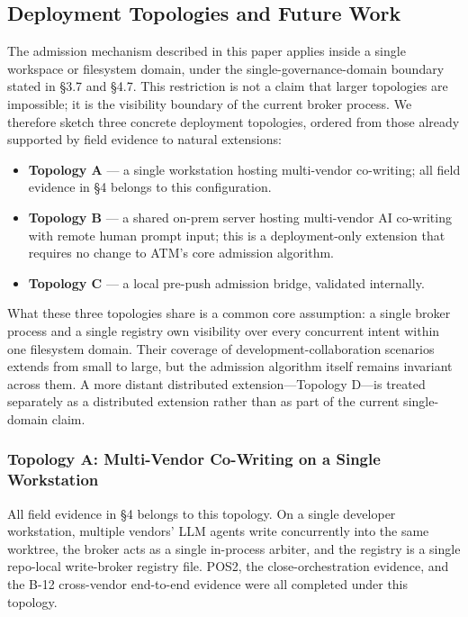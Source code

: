 \documentclass[9pt,letterpaper]{extarticle}
\begin{document}
\subsection{Deployment Topologies and Future Work}

The admission mechanism described in this paper applies inside a single workspace or filesystem domain, under the single-governance-domain boundary stated in §3.7 and §4.7. This restriction is not a claim that larger topologies are impossible; it is the visibility boundary of the current broker process. We therefore sketch three concrete deployment topologies, ordered from those already supported by field evidence to natural extensions:

\begin{itemize}
\item \textbf{Topology A} --- a single workstation hosting multi-vendor co-writing; all field evidence in §4 belongs to this configuration.
\item \textbf{Topology B} --- a shared on-prem server hosting multi-vendor AI co-writing with remote human prompt input; this is a deployment-only extension that requires no change to ATM's core admission algorithm.
\item \textbf{Topology C} --- a local pre-push admission bridge, validated internally.
\end{itemize}

What these three topologies share is a common core assumption: a single broker process and a single registry own visibility over every concurrent intent within one filesystem domain. Their coverage of development-collaboration scenarios extends from small to large, but the admission algorithm itself remains invariant across them. A more distant distributed extension---Topology D---is treated separately as a distributed extension rather than as part of the current single-domain claim.

\subsubsection*{Topology A: Multi-Vendor Co-Writing on a Single Workstation}

All field evidence in §4 belongs to this topology. On a single developer workstation, multiple vendors' LLM agents write concurrently into the same worktree, the broker acts as a single in-process arbiter, and the registry is a single repo-local write-broker registry file. POS2, the close-orchestration evidence, and the B-12 cross-vendor end-to-end evidence were all completed under this topology.
\end{document}
